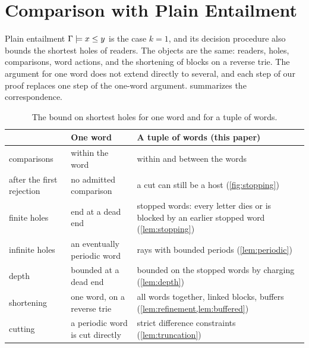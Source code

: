 \section{Comparison with Plain Entailment}
\label{sec:comparison}

Plain entailment $\Gamma\models x\le y$ is the case $k=1$, and its decision procedure
\cite{NSSE26} also bounds the shortest holes of readers. The objects are the same: readers,
holes, comparisons, word actions, and the shortening of blocks on a reverse trie. The
argument for one word does not extend directly to several, and each step of our proof
replaces one step of the one-word argument.  summarizes the
correspondence.

\begin{table}[!htb]
\centering\small
\caption{The bound on shortest holes for one word \cite{NSSE26} and for a tuple of words.}
\label{tab:comparison}
\begin{tabular}{@{}>{\raggedright\arraybackslash}p{}>{\raggedright\arraybackslash}p{}>{\raggedright\arraybackslash}p{}@{}}
\toprule
 & One word & A tuple of words (this paper)\\
\midrule
comparisons & within the word & within and between the words\\
after the first rejection & no admitted comparison & a cut can still be a host
  (\cref{fig:stopping})\\
finite holes & end at a dead end & stopped words: every letter dies or is blocked by an
  earlier stopped word (\cref{lem:stopping})\\
infinite holes & an eventually periodic word & rays with bounded periods
  (\cref{lem:periodic})\\
depth & bounded at a dead end & bounded on the stopped words by charging
  (\cref{lem:depth})\\
shortening & one word, on a reverse trie & all words together, linked blocks, buffers
  (\cref{lem:refinement,lem:buffered})\\
cutting & a periodic word is cut directly & strict difference constraints
  (\cref{lem:truncation})\\
\bottomrule
\end{tabular}
\end{table}

